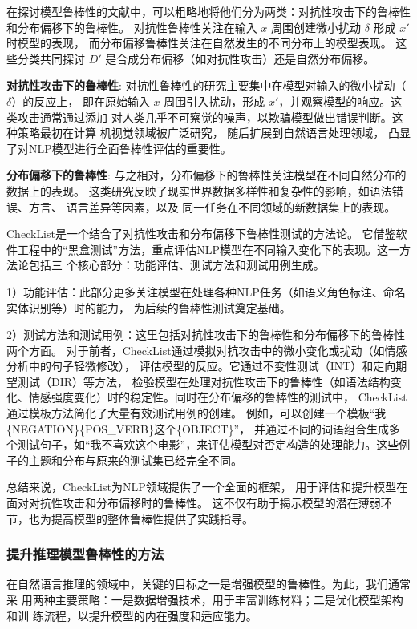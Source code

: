 在探讨模型鲁棒性的文献中，可以粗略地将他们分为两类：对抗性攻击下的鲁棒性和分布偏移下的鲁棒性。
对抗性鲁棒性关注在输入 $x$ 周围创建微小扰动 $\delta$ 形成 $x'$ 时模型的表现，
而分布偏移鲁棒性关注在自然发生的不同分布上的模型表现。
这些分类共同探讨 $D'$ 是合成分布偏移（如对抗性攻击）还是自然分布偏移。

\textbf{对抗性攻击下的鲁棒性}:
对抗性鲁棒性的研究主要集中在模型对输入的微小扰动（$\delta$）的反应上，
即在原始输入 $x$ 周围引入扰动，形成 $x'$，并观察模型的响应。这类攻击通常通过添加
对人类几乎不可察觉的噪声，以欺骗模型做出错误判断。这种策略最初在计算
机视觉领域被广泛研究\cite{szegedy2014intriguing,goodfellow2014explaining}，
随后扩展到自然语言处理领域\cite{Marco2020acl,tan2020s,schwinn2023exploring,boucher2022bad}，
凸显了对NLP模型进行全面鲁棒性评估的重要性。

\textbf{分布偏移下的鲁棒性}:
与之相对，分布偏移下的鲁棒性关注模型在不同自然分布的数据上的表现。
这类研究反映了现实世界数据多样性和复杂性的影响，如语法错误、方言、
语言差异等因素\cite{blodgett2016demographic, demszky2021learning}，以及
同一任务在不同领域的新数据集上的表现。


CheckList\cite{Marco2020acl}是一个结合了对抗性攻击和分布偏移下鲁棒性测试的方法论。
它借鉴软件工程中的``黑盒测试''方法，重点评估NLP模型在不同输入变化下的表现。这一方法论包括三
个核心部分：功能评估、测试方法和测试用例生成。

1）功能评估：此部分更多关注模型在处理各种NLP任务（如语义角色标注、命名实体识别等）时的能力，
为后续的鲁棒性测试奠定基础。

2）测试方法和测试用例：这里包括对抗性攻击下的鲁棒性和分布偏移下的鲁棒性两个方面。
对于前者，CheckList通过模拟对抗攻击中的微小变化或扰动（如情感分析中的句子轻微修改），
评估模型的反应\cite{goodfellow2014explaining}。它通过不变性测试（INT）和定向期望测试（DIR）等方法，
检验模型在处理对抗性攻击下的鲁棒性（如语法结构变化、情感强度变化）时的稳定性。同时在分布偏移的鲁棒性的测试中，
CheckList通过模板方法简化了大量有效测试用例的创建。
例如，可以创建一个模板``我\{NEGATION\}\{POS\_VERB\}这个\{OBJECT\}''，
并通过不同的词语组合生成多个测试句子，如``我不喜欢这个电影''，来评估模型对否定构造的处理能力。这些例子的主题和分布与原来的测试集已经完全不同。

总结来说，CheckList为NLP领域提供了一个全面的框架，
用于评估和提升模型在面对对抗性攻击和分布偏移时的鲁棒性。
这不仅有助于揭示模型的潜在薄弱环节，也为提高模型的整体鲁棒性提供了实践指导。

\subsubsection{提升推理模型鲁棒性的方法}
在自然语言推理的领域中，关键的目标之一是增强模型的鲁棒性。为此，我们通常采
用两种主要策略：一是数据增强技术，用于丰富训练材料；二是优化模型架构和训
练流程，以提升模型的内在强度和适应能力。

